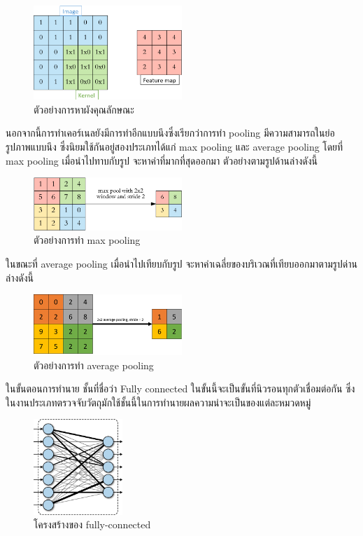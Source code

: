  \begin{figure}[!ht]
	\centering
	\includegraphics[width=0.5\textwidth]{chapter2/images/feature_map.png}
		\caption{ตัวอย่างการหาผังคุณลักษณะ }
    	\label{fig:example feature map}
\end{figure}

นอกจากนี้การทำเคอร์เนลยังมีการทำอีกแบบนึงซึ่งเรียกว่าการทำ pooling มีความสามารถในย่อรูปภาพแบบนึง ซึ่งนิยมใช้กันอยู่สองประเภทได้แก่ max pooling และ average pooling
โดยที่ max pooling เมื่อนำไปทาบกับรูป จะหาค่าที่มากที่สุดออกมา ตัวอย่างตามรูปด้านล่างดังนี้

 \begin{figure}[!ht]
	\centering
	\includegraphics[width=0.5\textwidth]{chapter2/images/max_pooling.png}
		\caption{ตัวอย่างการทำ max pooling }
    	\label{fig:example max pooling}
\end{figure} 

ในขณะที่ average pooling เมื่อนำไปเทียบกับรูป จะหาค่าเฉลี่ยของบริเวณที่เทียบออกมาตามรูปด่านล่างดังนี้

 \begin{figure}[!ht]
	\centering
	\includegraphics[width=0.5\textwidth]{chapter2/images/average_pooling.png}
		\caption{ตัวอย่างการทำ average pooling }
    	\label{fig:example average pooling}
\end{figure}
\clearpage
ในขั้นตอนการทำนาย ชั้นที่ชื่อว่า Fully connected ในขั้นนี้จะเป็นขั้นที่นิวรอนทุกตัวเชื่อมต่อกัน ซึ่งในงานประเภทตรวจจับวัตถุมักใช้ชั้นนี้ในการทำนายผลความน่าจะเป็นของแต่ละหมวดหมู่ 
 \begin{figure}[!ht]
	\centering
	\includegraphics[width=0.3\textwidth]{chapter2/images/fully-connected.png}
		\caption{โครงสร้างของ fully-connected}
    	\label{fig:fully-connected}
\end{figure}
